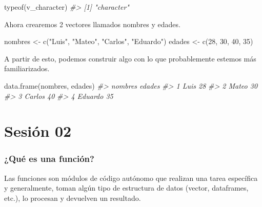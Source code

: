 \documentclass[
]{book}
\newenvironment{Shaded}{\begin{snugshade}}{\end{snugshade}}
\newcommand{\CommentTok}[1]{\textcolor[rgb]{0.56,0.35,0.01}{\textit{#1}}}
\newcommand{\DecValTok}[1]{\textcolor[rgb]{0.00,0.00,0.81}{#1}}
\newcommand{\FunctionTok}[1]{\textcolor[rgb]{0.00,0.00,0.00}{#1}}
\newcommand{\NormalTok}[1]{#1}
\newcommand{\OtherTok}[1]{\textcolor[rgb]{0.56,0.35,0.01}{#1}}
\newcommand{\StringTok}[1]{\textcolor[rgb]{0.31,0.60,0.02}{#1}}
\begin{document}
\begin{Shaded}
\begin{Highlighting}[]
\FunctionTok{typeof}\NormalTok{(v\_character)}
\CommentTok{\#\textgreater{} [1] "character"}
\end{Highlighting}
\end{Shaded}

Ahora crearemos 2 vectores llamados nombres y edades.

\begin{Shaded}
\begin{Highlighting}[]
\NormalTok{nombres }\OtherTok{\textless{}{-}} \FunctionTok{c}\NormalTok{(}\StringTok{"Luis"}\NormalTok{, }\StringTok{"Mateo"}\NormalTok{, }\StringTok{"Carlos"}\NormalTok{, }\StringTok{"Eduardo"}\NormalTok{)}
\NormalTok{edades }\OtherTok{\textless{}{-}} \FunctionTok{c}\NormalTok{(}\DecValTok{28}\NormalTok{, }\DecValTok{30}\NormalTok{, }\DecValTok{40}\NormalTok{, }\DecValTok{35}\NormalTok{)}
\end{Highlighting}
\end{Shaded}

A partir de esto, podemos construir algo con lo que probablemente estemos más familiarizados.

\begin{Shaded}
\begin{Highlighting}[]
\FunctionTok{data.frame}\NormalTok{(nombres, }
\NormalTok{           edades)}
\CommentTok{\#\textgreater{}   nombres edades}
\CommentTok{\#\textgreater{} 1    Luis     28}
\CommentTok{\#\textgreater{} 2   Mateo     30}
\CommentTok{\#\textgreater{} 3  Carlos     40}
\CommentTok{\#\textgreater{} 4 Eduardo     35}
\end{Highlighting}
\end{Shaded}

\hypertarget{sesiuxf3n-02}{%
\chapter{Sesión 02}\label{sesiuxf3n-02}}

\hypertarget{quuxe9-es-una-funciuxf3n}{%
\subsection{¿Qué es una función?}\label{quuxe9-es-una-funciuxf3n}}

Las funciones son módulos de código autónomo que realizan una tarea específica y generalmente, toman algún tipo de estructura de datos (vector, dataframes, etc.), lo procesan y devuelven un resultado.
\end{document}
